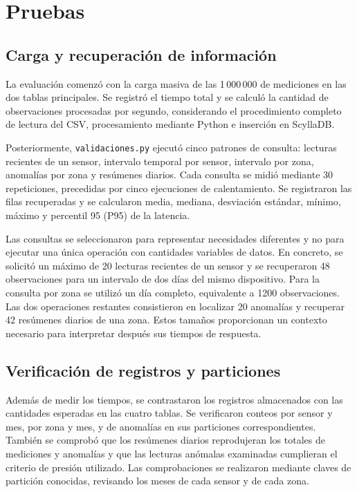 \documentclass[conference]{IEEEtran}
\begin{document}
\section{Pruebas}

\subsection{Carga y recuperación de información}

La evaluación comenzó con la carga masiva de las 1\,000\,000 de mediciones en las dos tablas principales. Se registró el tiempo total y se calculó la cantidad de observaciones procesadas por segundo, considerando el procedimiento completo de lectura del CSV, procesamiento mediante Python e inserción en ScyllaDB.

Posteriormente, \texttt{validaciones.py} ejecutó cinco patrones de consulta: lecturas recientes de un sensor, intervalo temporal por sensor, intervalo por zona, anomalías por zona y resúmenes diarios. Cada consulta se midió mediante 30 repeticiones, precedidas por cinco ejecuciones de calentamiento. Se registraron las filas recuperadas y se calcularon media, mediana, desviación estándar, mínimo, máximo y percentil 95 (P95) de la latencia.

Las consultas se seleccionaron para representar necesidades diferentes y no para ejecutar una única operación con cantidades variables de datos. En concreto, se solicitó un máximo de 20 lecturas recientes de un sensor y se recuperaron 48 observaciones para un intervalo de dos días del mismo dispositivo. Para la consulta por zona se utilizó un día completo, equivalente a 1200 observaciones. Las dos operaciones restantes consistieron en localizar 20 anomalías y recuperar 42 resúmenes diarios de una zona. Estos tamaños proporcionan un contexto necesario para interpretar después sus tiempos de respuesta.

\subsection{Verificación de registros y particiones}

Además de medir los tiempos, se contrastaron los registros almacenados con las cantidades esperadas en las cuatro tablas. Se verificaron conteos por sensor y mes, por zona y mes, y de anomalías en sus particiones correspondientes. También se comprobó que los resúmenes diarios reprodujeran los totales de mediciones y anomalías y que las lecturas anómalas examinadas cumplieran el criterio de presión utilizado. Las comprobaciones se realizaron mediante claves de partición conocidas, revisando los meses de cada sensor y de cada zona.
\end{document}

